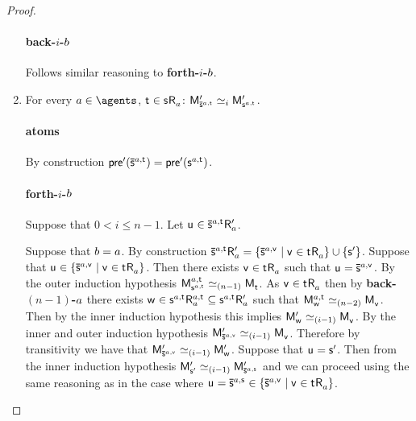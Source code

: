 \begin{proof}
\begin{enumerate}
        \paragraph{back-$i$-$b$} Follows similar reasoning to {\bf forth-$i$-$b$}.

    \item 
        For every $\agentA \in \agents$, $\aStateT \in \aStateS \aAccessibility{\agentA}$: $\aPModel[\prime]{\aPStateS[\agentA,\aStateT]} \bisimilar[i] \aPModel[\prime]{\aStateS[\agentA,\aStateT]}$.

        \paragraph{atoms} By construction $\aPrecondition[\prime](\aPStateS[\agentA,\aStateT]) = \aPrecondition[\prime](\aStateS[\agentA,\aStateT])$.

        \paragraph{forth-$i$-$b$} Suppose that $0 < i \leq n - 1$. Let $\aStateU \in \aPStateS[\agentA,\aStateT] \aAccessibility[\prime]{\agentA}$. 

        Suppose that $b = a$.
        By construction $\aPStateS[\agentA,\aStateT] \aAccessibility[\prime]{\agentA} = \{\aPStateS[\agentA,\aStateV] \mid \aStateV \in \aStateT \aAccessibility{\agentA}\} \cup \{\aStateS[\prime]\}$. 
        Suppose that $\aStateU \in \{\aPStateS[\agentA,\aStateV] \mid \aStateV \in \aStateT \aAccessibility{\agentA}\}$.
        Then there exists $\aStateV \in \aStateT \aAccessibility{\agentA}$ such that $\aStateU = \aPStateS[\agentA,\aStateV]$.
        By the outer induction hypothesis $\aPModel[\agentA,\aStateT]{\aStateS[\agentA,\aStateT]} \bisimilar[(n - 1)] \aPModel{\aStateT}$.
        As $\aStateV \in \aStateT \aAccessibility{\agentA}$ then by {\bf back-$(n-1)$-$a$} there exists $\aStateW \in \aStateS[\agentA,\aStateT] \aAccessibility[\agentA,\aStateT]{\agentA} \subseteq \aStateS[\agentA,\aStateT] \aAccessibility[\prime]{\agentA}$ such that $\aPModel[\agentA,\aStateT]{\aStateW} \bisimilar[(n - 2)] \aPModel{\aStateV}$.
        Then by the inner induction hypothesis this implies $\aPModel[\prime]{\aStateW} \bisimilar[(i - 1)] \aPModel{\aStateV}$.
        By the inner and outer induction hypothesis $\aPModel[\prime]{\aPStateS[\agentA,\aStateV]} \bisimilar[(i - 1)] \aPModel{\aStateV}$.
        Therefore by transitivity we have that $\aPModel[\prime]{\aPStateS[\agentA,\aStateV]} \bisimilar[(i - 1)] \aPModel[\prime]{\aStateW}$.
        Suppose that $\aStateU = \aStateS[\prime]$. 
        Then from the inner induction hypothesis $\aPModel[\prime]{\aStateS[\prime]} \bisimilar[(i - 1)] \aPModel[\prime]{\aPStateS[\agentA,\aStateS]}$ and we can proceed using the same reasoning as in the case where $\aStateU = \aPStateS[\agentA,\aStateS] \in \{\aPStateS[\agentA,\aStateV] \mid \aStateV \in \aStateT \aAccessibility{\agentA}\}$.


\end{enumerate}
\end{proof}
